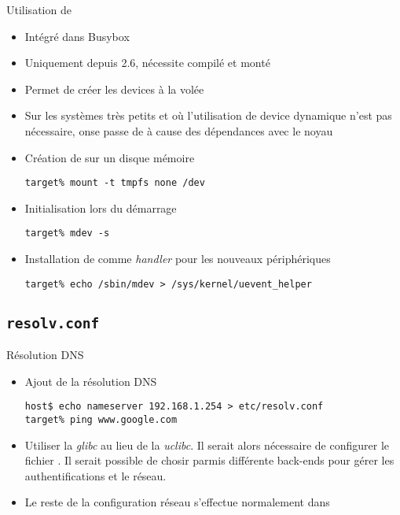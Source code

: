 \begin{frame}[fragile=singleslide]{Utilisation de }
  \begin{itemize}
  \item Intégré dans Busybox
  \item Uniquement depuis 2.6, nécessite  compilé et monté
  \item Permet de créer les devices à la volée
  \item Sur  les systèmes  très petits et  où l'utilisation  de device
    dynamique n'est  pas nécessaire, onse passe de   à cause
    des dépendances avec le noyau
  \item Création de  sur un disque mémoire
    \begin{lstlisting}
target% mount -t tmpfs none /dev
    \end{lstlisting}
  \item Initialisation  lors du démarrage
    \begin{lstlisting}
target% mdev -s
    \end{lstlisting}
  \item  Installation  de    comme \emph{handler}  pour  les
    nouveaux périphériques
    \begin{lstlisting}
target% echo /sbin/mdev > /sys/kernel/uevent_helper
    \end{lstlisting}
  \end{itemize}
\end{frame}

\subsection{\texttt{resolv.conf}}

\begin{frame}[fragile=singleslide]{Résolution DNS}
  \begin{itemize}
  \item Ajout de la résolution DNS
    \begin{lstlisting}
host$ echo nameserver 192.168.1.254 > etc/resolv.conf
target% ping www.google.com
    \end{lstlisting}
  \item  Utiliser la  \emph{glibc}  au lieu  de  la \emph{uclibc}.  Il
    serait    alors    nécessaire    de    configurer    le    fichier
    .   Il  serait   possible  de   chosir  parmis
    différente  back-ends  pour  gérer  les  authentifications  et  le
    réseau.
  \item  Le reste  de la  configuration réseau  s'effectue normalement
    dans 
  \end{itemize}
\end{frame}


